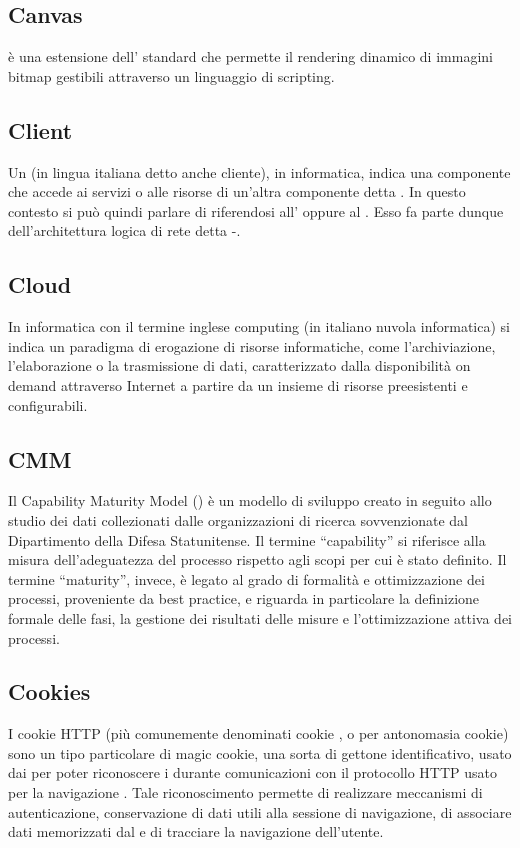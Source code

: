 \subsection*{Canvas}
 è una estensione dell' standard che permette il rendering dinamico di immagini bitmap gestibili attraverso un linguaggio di scripting.

\subsection*{Client}
Un  (in lingua italiana detto anche cliente), in informatica, indica una componente che accede ai servizi o alle risorse di un'altra componente detta . In questo contesto si può quindi parlare di  riferendosi all' oppure al . Esso fa parte dunque dell'architettura logica di rete detta -.

\subsection*{Cloud}
In informatica con il termine inglese  computing (in italiano nuvola informatica) si indica un paradigma di erogazione di risorse informatiche, come l'archiviazione, l'elaborazione o la trasmissione di dati, caratterizzato dalla disponibilità on demand attraverso Internet a partire da un insieme di risorse preesistenti e configurabili.

\subsection*{CMM}
Il Capability Maturity Model () è un modello di sviluppo creato in seguito allo
studio dei dati collezionati dalle organizzazioni di ricerca sovvenzionate dal Dipartimento
della Difesa Statunitense. Il termine “capability” si riferisce alla misura dell’adeguatezza
del processo rispetto agli scopi per cui è stato definito. Il termine “maturity”, invece, è
legato al grado di formalità e ottimizzazione dei processi, proveniente da best practice, e
riguarda in particolare la definizione formale delle fasi, la gestione dei risultati delle misure
e l’ottimizzazione attiva dei processi.

\subsection*{Cookies}
I cookie HTTP (più comunemente denominati cookie , o per antonomasia cookie) sono un tipo particolare di magic cookie, una sorta di gettone identificativo, usato dai   per poter riconoscere i  durante comunicazioni con il protocollo HTTP usato per la navigazione . Tale riconoscimento permette di realizzare meccanismi di autenticazione, conservazione di dati utili alla sessione di navigazione, di associare dati memorizzati dal  e di tracciare la navigazione dell'utente.

